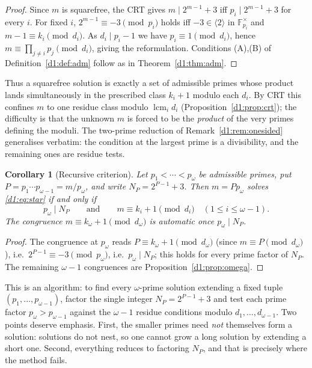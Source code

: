 \documentclass[a4paper]{article}
\theoremstyle{plain}
\newtheorem{corollary}{Corollary}[subsection]
\theoremstyle{definition}
\theoremstyle{remark}
\newcommand{\F}{\mathbb{F}}
\newcommand{\gen}[1]{\langle #1 \rangle}
\DeclareMathOperator{\lcm}{lcm}
\begin{document}
\begin{proof}
Since $m$ is squarefree, the CRT gives $m\mid 2^{m-1}+3$ iff $p_{i}\mid 2^{m-1}+3$ for every
$i$. For fixed $i$, $2^{m-1}\equiv-3\pmod{p_{i}}$ holds iff $-3\in\gen{2}$ in $\F_{p_{i}}^{\times}$
and $m-1\equiv k_{i}\pmod{d_{i}}$. As $d_{i}\mid p_{i}-1$ we have $p_{i}\equiv 1\pmod{d_{i}}$,
hence $m\equiv\prod_{j\ne i}p_{j}\pmod{d_{i}}$, giving the reformulation. Conditions (A),(B) of
Definition~\ref{d1:def:adm} follow as in Theorem~\ref{d1:thm:adm}.
\end{proof}

Thus a squarefree solution is exactly a set of admissible primes whose product lands
simultaneously in the prescribed class $k_{i}+1$ modulo each $d_{i}$. By CRT this confines $m$ to
one residue class modulo $\lcm_{i}d_{i}$ (Proposition~\ref{d1:prop:crt}); the difficulty is that the
unknown $m$ is forced to be the \emph{product} of the very primes defining the moduli. The
two-prime reduction of Remark~\ref{d1:rem:onesided} generalises verbatim: the condition at the
largest prime is a divisibility, and the remaining ones are residue tests.

\begin{corollary}[Recursive criterion]\label{d1:cor:omega}
Let $p_{1}<\cdots<p_{\omega}$ be admissible primes, put $P=p_{1}\cdots p_{\omega-1}=m/p_{\omega}$,
and write $N_{P}=2^{P-1}+3$. Then $m=Pp_{\omega}$ solves \eqref{d1:eq:star} if and only if
\[
p_{\omega}\mid N_{P}\qquad\text{and}\qquad m\equiv k_{i}+1\pmod{d_{i}}\quad(1\le i\le\omega-1).
\]
The congruence $m\equiv k_{\omega}+1\pmod{d_{\omega}}$ is automatic once $p_{\omega}\mid N_{P}$.
\end{corollary}

\begin{proof}
The congruence at $p_{\omega}$ reads $P\equiv k_{\omega}+1\pmod{d_{\omega}}$ (since $m\equiv P
\pmod{d_{\omega}}$), i.e.\ $2^{P-1}\equiv-3\pmod{p_{\omega}}$, i.e.\ $p_{\omega}\mid N_{P}$; this
holds for every prime factor of $N_{P}$. The remaining $\omega-1$ congruences are
Proposition~\ref{d1:prop:omega}.
\end{proof}

This is an algorithm: to find every $\omega$-prime solution extending a fixed tuple
$(p_{1},\dots,p_{\omega-1})$, factor the single integer $N_{P}=2^{P-1}+3$ and test each prime
factor $p_{\omega}>p_{\omega-1}$ against the $\omega-1$ residue conditions modulo
$d_{1},\dots,d_{\omega-1}$. Two points deserve emphasis. First, the smaller primes need
\emph{not} themselves form a solution: solutions do not nest, so one cannot grow a long solution
by extending a short one. Second, everything reduces to factoring $N_{P}$, and that is precisely
where the method fails.
\end{document}
